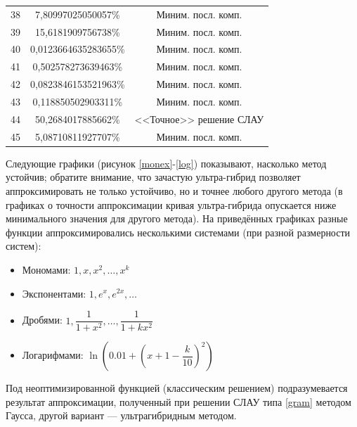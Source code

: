 \documentclass[a4paper]{article}
\begin{document}
\begin{table}[h]
\begin{center}
\begin{tabular}[t]{|c|c|c|}
      38       & 7,80997025050057\%     & Миним. посл. комп.   \\
      39       & 15,6181909756738\%     & Миним. посл. комп.   \\
      40       & 0,0123664635283655\%   & Миним. посл. комп.   \\
      41       & 0,502578273639463\%    & Миним. посл. комп.   \\
      42       & 0,0823846153521963\%   & Миним. посл. комп.   \\
      43       & 0,118850502903311\%    & Миним. посл. комп.   \\
      44       & 50,2684017885662\%     & <<Точное>> решение СЛАУ   \\
      45       & 5,08710811927707\%     & Миним. посл. комп.   \\
      \hline
    \end{tabular}
  \end{center}
\end{table}



Следующие графики (рисунок \ref{monex}-\ref{log}) показывают, насколько метод устойчив;
обратите внимание, что зачастую ультра-гибрид позволяет аппроксимировать не только устойчиво,
но и точнее любого другого метода (в графиках о точности аппроксимации кривая ультра-гибрида опускается ниже минимального значения для другого метода).
На приведённых графиках разные функции аппроксимировались несколькими системами (при разной размерности систем):
\begin{itemize}
  \item Мономами: $1, x, x^2,\dots , x^k$
  \item Экспонентами: $1, e^x, e^{2x},\dots$
  \item Дробями: $1,\dfrac{1}{1+x^2}, \dots , \dfrac{1}{1+kx^2}$
  \item Логарифмами: $\ln\left(0.01 + \left(x+1-\dfrac{k}{10}\right)^2\right)$
\end{itemize}
Под неоптимизированной функцией (классическим решением) подразумевается результат аппроксимации, полученный при решении СЛАУ типа \ref{gram} методом Гаусса, другой вариант --- ультрагибридным методом.
\end{document}
